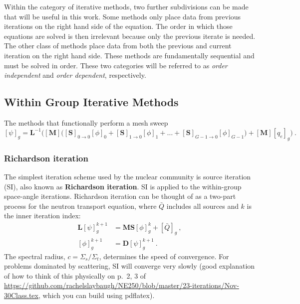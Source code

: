 \documentclass[12pt]{article}
\newcommand{\ve}[1]{\ensuremath{\mathbf{#1}}}
\newcommand{\Macro}{\ensuremath{\Sigma}}
\begin{document}
Within the category of iterative methods, two further subdivisions can be made that will be useful in this work. Some methods only place data from previous iterations on the right hand side of the equation. The order in which those equations are solved is then irrelevant because only the previous iterate is needed. The other class of methods place data from both the previous and current iteration on the right hand side. These methods are fundamentally sequential and must be solved in order. These two categories will be referred to as \textit{order independent} and \textit{order dependent}, respectively. 

\subsection*{Within Group Iterative Methods}
The methods that functionally perform a mesh sweep
\[
[\psi]_g = \ve{L}^{-1}\bigl([\ve{M}]\bigl([\ve{S}]_{0\rightarrow0}[\phi]_0 + 
    [\ve{S}]_{1\rightarrow0}[\phi]_1 + \ldots + [\ve{S}]_{G-1\rightarrow0}[\phi]_{G-1}\bigr) + 
    [\ve{M}][q_{e}]_g\bigr)\:.
\]
\subsubsection*{Richardson iteration}
The simplest iteration scheme used by the nuclear community is source iteration (SI), also known as \textbf{Richardson iteration}. SI is applied to the within-group space-angle iterations. Richardson iteration can be thought of as a two-part process for the neutron transport equation, where $\bar{Q}$ includes all sources and $k$ is the inner iteration index:
%
\begin{align}
  \ve{L}[\psi]_g^{k+1} &= \ve{MS} [\phi]_g^k + [\bar{Q}]_{g} \:,   \label{eq:SIpsi} \\
  [\phi]_g^{k+1} &= \ve{D}[\psi]_g^{k+1} \:.
  \label{eq:SIphi}
\end{align}
%
The spectral radius, $c = \Macro_s / \Macro_t$, determines the speed of convergence. For problems dominated by scattering, SI will converge very slowly (good explanation of how to think of this physically on p.\ 2, 3 of  \href{https://github.com/rachelslaybaugh/NE250/blob/master/23-iterations/Nov-30Class.tex}{https://github.com/rachelslaybaugh/NE250/blob/master/23-iterations/Nov-30Class.tex}, which you can build using pdflatex). 
\end{document}

